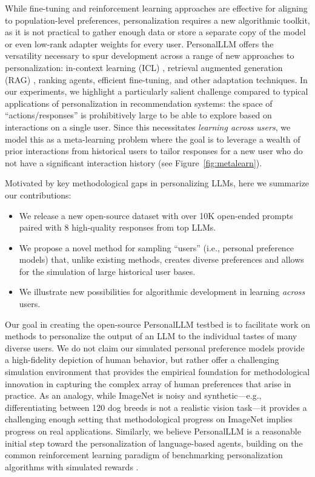 While fine-tuning and reinforcement learning approaches \citep{schulman2017proximal, rafailov2023direct} are effective for aligning to population-level preferences,
personalization requires a new algorithmic toolkit, as it is not practical to gather enough data or
store a separate copy of the model or even low-rank adapter weights \citep{Hu2021} for every user.
\textsf{PersonalLLM} offers the versatility necessary to spur development across a range of new approaches to personalization: in-context learning (ICL) \citep{brown2020language}, retrieval augmented generation (RAG) \citep{lewis2021retrievalaugmented}, ranking agents, efficient fine-tuning, and other adaptation techniques.
In our experiments, we highlight a particularly salient challenge compared to typical applications of personalization in recommendation systems: the space of “actions/responses” is prohibitively large to be able to explore based on interactions on a single user. Since this necessitates  \textit{learning across users}, we model this as a meta-learning problem where the goal is to leverage a wealth of prior interactions from historical users to tailor responses for a new user who do not have a significant interaction history (see Figure~\ref{fig:metalearn}).

Motivated by key methodological gaps in personalizing LLMs, here we summarize our contributions:
\begin{itemize}
    \item  We release a new open-source dataset with over 10K open-ended prompts paired with 8 high-quality responses from top LLMs.
    \item We propose a novel method for sampling ``users'' (i.e., personal preference models) that, unlike existing methods, creates diverse preferences and allows for the simulation of large historical user bases.
    \item We illustrate new possibilities for algorithmic development in learning \textit{across} users.
\end{itemize}

Our goal in creating the open-source \textsf{PersonalLLM} testbed is to facilitate work on methods to personalize the output of an LLM to the individual tastes of many diverse users.
We do not claim our simulated personal preference models provide a high-fidelity depiction of human behavior, but rather offer a challenging simulation environment that provides the empirical foundation for methodological innovation in capturing the complex array of human preferences that arise in practice.
As an analogy, while ImageNet \citep{russakovsky2015imagenetlargescalevisual} is noisy and synthetic---e.g., differentiating between 120 dog breeds is not a realistic vision task---it provides a challenging enough setting that methodological progress on ImageNet implies progress on real applications.
Similarly, we believe \textsf{PersonalLLM} is a reasonable initial step toward the personalization of language-based agents, building on the common reinforcement learning paradigm of benchmarking personalization algorithms with simulated rewards \citep{zhao2023kuaisimcomprehensivesimulatorrecommender, ie2019recsimconfigurablesimulationplatform}.

